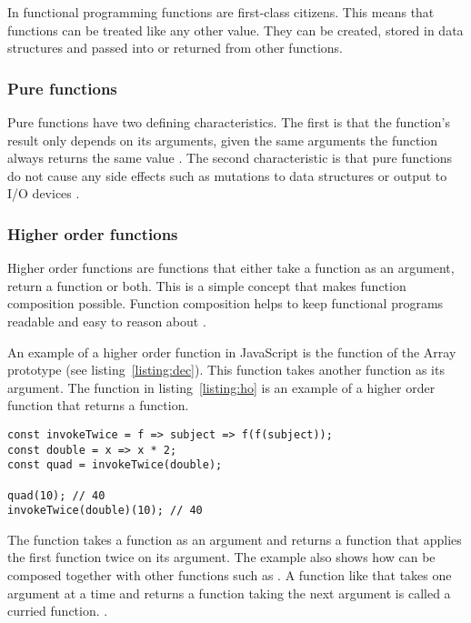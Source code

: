 In functional programming functions are first-class citizens. This means that functions can be treated like any other value. They can be created, stored in data structures and passed into or returned from other functions.

\subsubsection{Pure functions}

Pure functions have two defining characteristics. The first is that the function's result only depends on its arguments, given the same arguments the function always returns the same value \cite{intro-func}. The second characteristic is that pure functions do not cause any side effects such as mutations to data structures or output to I/O devices \cite{intro-func}.

\subsubsection{Higher order functions} %
\label{sub:fp-order}

Higher order functions are functions that either take a function as an argument, return a function or both. This is a simple concept that makes function composition possible. Function composition helps to keep functional programs readable and easy to reason about \cite{intro-func}.

An example of a higher order function in JavaScript is the  function of the Array prototype (see listing~\ref{listing:dec}). This function takes another function as its argument. The  function in listing~\ref{listing:ho} is an example of a higher order function that returns a function.

\begin{lstlisting}[caption=Higher order function composition,label=listing:ho]
const invokeTwice = f => subject => f(f(subject));
const double = x => x * 2;
const quad = invokeTwice(double);

quad(10); // 40
invokeTwice(double)(10); // 40
\end{lstlisting}

The  function takes a function as an argument and returns a function that applies the first function twice on its argument. The example also shows how  can be composed together with other functions such as . A function like  that takes one argument at a time and returns a function taking the next argument is called a curried function. \cite{func-js}.

